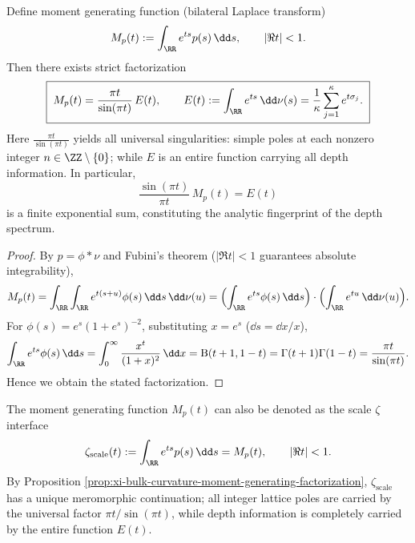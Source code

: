 \begin{proposition}\label{prop:xi-bulk-curvature-moment-generating-factorization}
Define moment generating function (bilateral Laplace transform)
\[
M_p(t):=\int_{\RR}e^{ts}p(s)\,\dd s,
\qquad |\Re t|<1.
\]
Then there exists strict factorization
\[
\boxed{\;
M_p(t)=\frac{\pi t}{\sin(\pi t)}\,E(t),\qquad
E(t):=\int_{\RR}e^{ts}\,\dd\nu(s)=\frac{1}{\kappa}\sum_{j=1}^{\kappa}e^{t\sigma_j}.\;}
\]
Here \(\frac{\pi t}{\sin(\pi t)}\) yields all universal singularities: simple poles at each nonzero integer \(n\in\ZZ\setminus\{0\}\);
while \(E\) is an entire function carrying all depth information.
In particular,
\[
\boxed{\;\frac{\sin(\pi t)}{\pi t}\,M_p(t)=E(t)\;}
\]
is a finite exponential sum, constituting the analytic fingerprint of the depth spectrum.
\end{proposition}
\begin{proof}
By \(p=\phi*\nu\) and Fubini's theorem (\(|\Re t|<1\) guarantees absolute integrability),
\[
M_p(t)=\int_{\RR}\int_{\RR}e^{t(s+u)}\phi(s)\,\dd s\,\dd\nu(u)
=\Bigl(\int_{\RR}e^{ts}\phi(s)\,\dd s\Bigr)\cdot\Bigl(\int_{\RR}e^{tu}\,\dd\nu(u)\Bigr).
\]
For \(\phi(s)=e^{s}(1+e^{s})^{-2}\), substituting \(x=e^{s}\) (\(\dd s=\dd x/x\)),
\[
\int_{\RR}e^{ts}\phi(s)\,\dd s
=\int_{0}^{\infty}\frac{x^{t}}{(1+x)^{2}}\,\dd x
=\mathrm{B}(t+1,1-t)
=\Gamma(t+1)\Gamma(1-t)
=\frac{\pi t}{\sin(\pi t)}.
\]
Hence we obtain the stated factorization.
\end{proof}

\begin{remark}\label{rem:xi-bulk-curvature-scale-zeta-notation}
The moment generating function \(M_p(t)\) can also be denoted as the scale \(\zeta\) interface
\[
\zeta_{\mathrm{scale}}(t):=\int_{\RR}e^{ts}p(s)\,\dd s=M_p(t),
\qquad
|\Re t|<1.
\]
By Proposition \ref{prop:xi-bulk-curvature-moment-generating-factorization}, \(\zeta_{\mathrm{scale}}\) has a unique meromorphic continuation;
all integer lattice poles are carried by the universal factor \(\pi t/\sin(\pi t)\), while depth information is completely carried by the entire function \(E(t)\).
\end{remark}

